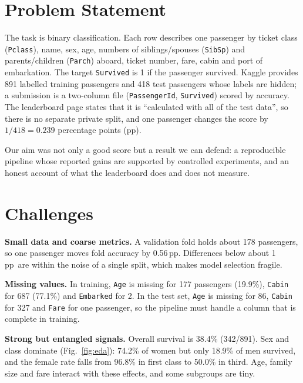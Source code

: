 \documentclass[10pt,twocolumn,letterpaper]{article}
\newcommand{\pp}{\,pp}
\begin{document}
\section{Problem Statement}
The task is binary classification. Each row describes one passenger by ticket class (\texttt{Pclass}), name, sex, age, numbers of siblings/spouses (\texttt{SibSp}) and parents/children (\texttt{Parch}) aboard, ticket number, fare, cabin and port of embarkation. The target \texttt{Survived} is 1 if the passenger survived. Kaggle provides 891 labelled training passengers and 418 test passengers whose labels are hidden; a submission is a two-column file (\texttt{PassengerId}, \texttt{Survived}) scored by accuracy. The leaderboard page states that it is ``calculated with all of the test data'', so there is no separate private split, and one passenger changes the score by $1/418 = 0.239$ percentage points (pp).

Our aim was not only a good score but a result we can defend: a reproducible pipeline whose reported gains are supported by controlled experiments, and an honest account of what the leaderboard does and does not measure.

\section{Challenges}
\textbf{Small data and coarse metrics.} A validation fold holds about 178 passengers, so one passenger moves fold accuracy by 0.56\pp. Differences below about 1\pp\ are within the noise of a single split, which makes model selection fragile.

\textbf{Missing values.} In training, \texttt{Age} is missing for 177 passengers (19.9\%), \texttt{Cabin} for 687 (77.1\%) and \texttt{Embarked} for 2. In the test set, \texttt{Age} is missing for 86, \texttt{Cabin} for 327 and \texttt{Fare} for one passenger, so the pipeline must handle a column that is complete in training.

\textbf{Strong but entangled signals.} Overall survival is 38.4\% (342/891). Sex and class dominate (Fig.~\ref{fig:eda}): 74.2\% of women but only 18.9\% of men survived, and the female rate falls from 96.8\% in first class to 50.0\% in third. Age, family size and fare interact with these effects, and some subgroups are tiny.
\end{document}
